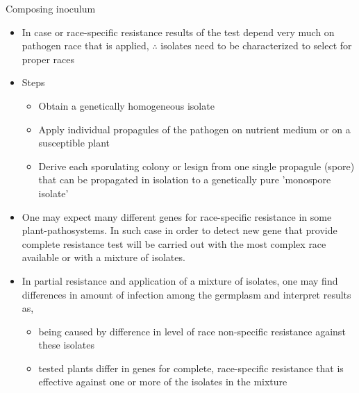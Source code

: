 \documentclass[11pt,dvipsnames,ignorenonframetext,aspectratio=169]{beamer}
\providecommand{\tightlist}{%
  \setlength{\itemsep}{0pt}\setlength{\parskip}{0pt}}
\begin{document}
\begin{frame}{Composing inoculum}
\protect\hypertarget{composing-inoculum}{}
\footnotesize

\begin{itemize}
\tightlist
\item
  In case or race-specific resistance results of the test depend very
  much on pathogen race that is applied, \(\therefore\) isolates need to
  be characterized to select for proper races
\item
  Steps

  \begin{itemize}
  \footnotesize
  \item Obtain a genetically homogeneous isolate
  \item Apply individual propagules of the pathogen on nutrient medium or on a susceptible plant
  \item Derive each sporulating colony or lesign from one single propagule (spore) that can be propagated in isolation to a genetically pure 'monospore isolate'
  \end{itemize}
\item
  One may expect many different genes for race-specific resistance in
  some plant-pathosystems. In such case in order to detect new gene that
  provide complete resistance test will be carried out with the most
  complex race available or with a mixture of isolates.
\item
  In partial resistance and application of a mixture of isolates, one
  may find differences in amount of infection among the germplasm and
  interpret results as,

  \begin{itemize}
  \footnotesize
  \item being caused by difference in level of race non-specific resistance against these isolates
  \item tested plants differ in genes for complete, race-specific resistance that is effective against one or more of the isolates in the mixture
  \end{itemize}
\end{itemize}
\end{frame}
\end{document}
